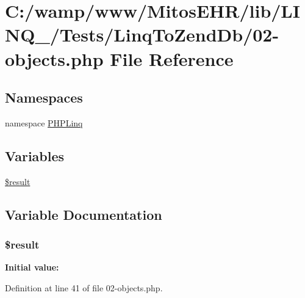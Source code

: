 \hypertarget{_linq_to_zend_db_202-objects_8php}{\section{\-C\-:/wamp/www/\-Mitos\-E\-H\-R/lib/\-L\-I\-N\-Q\-\_/\-Tests/\-Linq\-To\-Zend\-Db/02-\/objects.php \-File \-Reference}
\label{_linq_to_zend_db_202-objects_8php}
}
\subsection*{\-Namespaces}
\begin{DoxyCompactItemize}
\item 
namespace \hyperlink{namespace_p_h_p_linq}{\-P\-H\-P\-Linq}
\end{DoxyCompactItemize}
\subsection*{\-Variables}
\begin{DoxyCompactItemize}
\item 
\hyperlink{_linq_to_zend_db_202-objects_8php_a112ef069ddc0454086e3d1e6d8d55d07}{\$result}
\end{DoxyCompactItemize}


\subsection{\-Variable \-Documentation}
\hypertarget{_linq_to_zend_db_202-objects_8php_a112ef069ddc0454086e3d1e6d8d55d07}{
\subsubsection[{\$result}]{\setlength{\rightskip}{0pt plus 5cm}\$result}}\label{_linq_to_zend_db_202-objects_8php_a112ef069ddc0454086e3d1e6d8d55d07}
{\bfseries \-Initial value\-:}


\-Definition at line 41 of file 02-\/objects.\-php.

